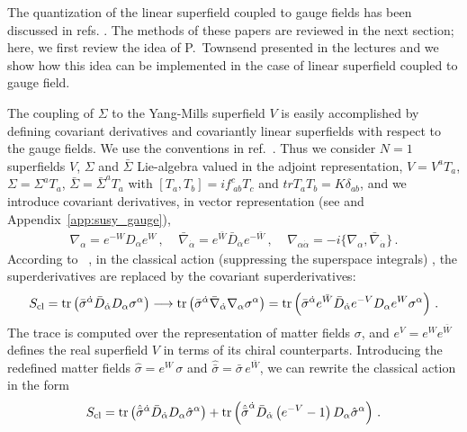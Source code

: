 \documentclass[a4paper,12pt]{article}
\begin{document}
The quantization of the linear superfield coupled to gauge fields
has been discussed in refs. \cite{GPZ,PZ}. The methods of these
papers are reviewed in the next section; here, we first review the
idea of P.~Townsend presented in the lectures \cite{3lectures} and we
show how this idea can be implemented in the case of linear superfield
coupled to gauge field.

The coupling of $\Sigma$ to the Yang-Mills superfield $V$ is easily
accomplished by defining covariant derivatives and covariantly linear
superfields with respect to the gauge fields. We use the conventions
in ref.~\cite{superspace}.  Thus we consider $N=1$ superfields $V$,
$\Sigma$ and $\bar\Sigma$ Lie-algebra valued in the adjoint
representation, $V=V^a T_a$, $\Sigma=\Sigma^a T_a$,
$\bar\Sigma=\bar\Sigma^a T_a$ with $[T_a,T_b]=i f^c_{~ab} T_c$ and $tr
T_a T_b= K\delta_{ab}$, and we introduce covariant derivatives, in
vector representation (see \cite{superspace} and
Appendix~\ref{app:susy_gauge}),
\begin{eqnarray*}\label{covderiv}
\nabla_\alpha= e^{-W} D_\alpha e^{W}\,,~~~~~
\bar\nabla_{\dot\alpha} = e^{\bar W} \bar D_{\dot\alpha} e^{-\bar W}\,,~~~~~
\nabla_{\alpha {\dot\alpha}}= -i \{\nabla_\alpha,\bar\nabla_{\dot\alpha}\}\,.
\end{eqnarray*}
According to~ \cite{GPZ,PZ}, in the classical action (suppressing the 
superspace integrals) , the superderivatives are replaced by the 
covariant superderivatives:
\begin{equation}
  \label{gau_1}
  S_{\rm cl}=
{\rm tr} \left(  \bar \sigma^{\dot \alpha} \bar D_{\dot \alpha}
  D_\alpha \sigma^\alpha \right)  
\longrightarrow 
{\rm tr} \left( \bar \sigma^{\dot \alpha}  \bar\nabla_{\dot \alpha}
  \nabla_\alpha \sigma^\alpha \right) 
= 
{\rm tr} \left( \bar \sigma^{\dot \alpha}  e^{\bar W} \bar D_{\dot
    \alpha} e^{-V} D_\alpha e^W \sigma^\alpha \right)\, . 
\end{equation}
The trace is computed over the representation of matter fields
$\sigma$, and $e^V = e^W e^{\bar W}$ defines the real superfield $V$ in
terms of its chiral counterparts. Introducing the redefined matter
fields $\hat\sigma = e^W \, \sigma$ and $\hat {\bar \sigma} = \bar
\sigma \, e^{\bar W}$, we can rewrite the classical action in the form
\begin{equation}
  \label{gau_2}
S_{\rm cl}= {\rm tr} \left(  \hat{\bar \sigma}^{\dot \alpha} \bar
  D_{\dot \alpha} D_\alpha \hat\sigma^\alpha \right)  
+  {\rm tr} \left(  {\hat {\bar \sigma}}^{\dot \alpha} \bar D_{\dot
    \alpha} \left( e^{-V} -1 \right) D_\alpha  
{\hat\sigma}^\alpha \right)\,. 
\end{equation}
\end{document}
